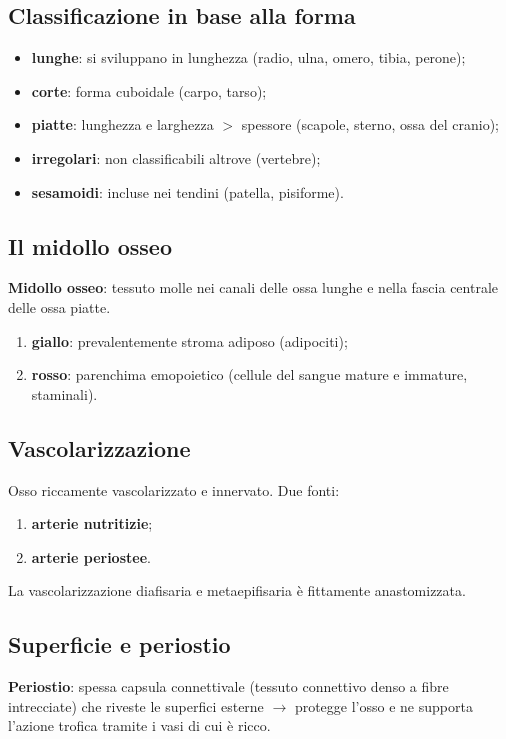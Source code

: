 \subsection{Classificazione in base alla forma}
\begin{itemize}
  \item \textbf{lunghe}: si sviluppano in lunghezza (radio, ulna, omero, tibia, perone);
  \item \textbf{corte}: forma cuboidale (carpo, tarso);
  \item \textbf{piatte}: lunghezza e larghezza $>$ spessore (scapole, sterno, ossa del cranio);
  \item \textbf{irregolari}: non classificabili altrove (vertebre);
  \item \textbf{sesamoidi}: incluse nei tendini (patella, pisiforme).
\end{itemize}

\subsection{Il midollo osseo}
\textbf{Midollo osseo}: tessuto molle nei canali delle ossa lunghe e nella fascia centrale delle
ossa piatte.
\begin{enumerate}
  \item \textbf{giallo}: prevalentemente stroma adiposo (adipociti);
  \item \textbf{rosso}: parenchima emopoietico (cellule del sangue mature e immature, staminali).
\end{enumerate}

\subsection{Vascolarizzazione}
Osso riccamente vascolarizzato e innervato. Due fonti:
\begin{enumerate}
  \item \textbf{arterie nutritizie};
  \item \textbf{arterie periostee}.
\end{enumerate}
La vascolarizzazione diafisaria e metaepifisaria è fittamente anastomizzata.

\subsection{Superficie e periostio}
\textbf{Periostio}: spessa capsula connettivale (tessuto connettivo denso a fibre intrecciate) che
riveste le superfici esterne $\rightarrow$ protegge l'osso e ne supporta l'azione trofica tramite i
vasi di cui è ricco.

